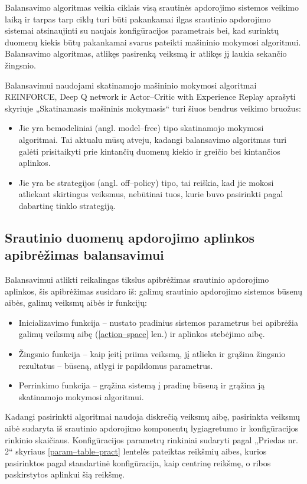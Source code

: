 \documentclass{VUMIFPSbakalaurinis}
\begin{document}
Balansavimo algoritmas veikia ciklais visą srautinės apdorojimo sistemos veikimo laiką ir tarpas tarp ciklų turi būti pakankamai ilgas srautinio apdorojimo sistemai atsinaujinti su naujais konfigūracijos parametrais bei, kad surinktų duomenų kiekis būtų pakankamai svarus pateikti mašininio mokymosi algoritmui. Balansavimo algoritmas, atlikęs pasirenką veiksmą ir atlikęs jį laukia sekančio žingsnio. 

Balansavimui naudojami skatinamojo mašininio mokymosi algoritmai REINFORCE, Deep Q network ir Actor–Critic with Experience Replay aprašyti skyriuje „Skatinamasis mašininis mokymasis“ turi šiuos bendrus veikimo bruožus:
\begin{itemize}
    \item Jie yra bemodeliniai (angl. model–free) tipo skatinamojo mokymosi algoritmai. Tai aktualu mūsų atveju, kadangi balansavimo algoritmas turi galėti prisitaikyti prie kintančių duomenų kiekio ir greičio bei kintančios aplinkos.
    \item Jie yra be strategijos (angl. off–policy) tipo, tai reiškia, kad jie mokosi atliekant skirtingus veiksmus, nebūtinai tuos, kurie buvo pasirinkti pagal dabartinę tinklo strategiją.
\end{itemize} 

\subsection{Srautinio duomenų apdorojimo aplinkos apibrėžimas balansavimui}

Balansavimui atlikti reikalingas tikslus apibrėžimas srautinio apdorojimo aplinkos, šis apibrėžimas susidaro iš: galimų srautinio apdorojimo sistemos būsenų aibės, galimų veiksmų aibės ir funkcijų:
\begin{itemize}
    \item Inicializavimo funkcija – nustato pradinius sistemos parametrus bei apibrėžia galimų veiksmų aibę (\ref{action–space} len.) ir aplinkos stebėjimo aibę.
    \item Žingsnio funkcija – kaip įeitį priima veiksmą, jį atlieka ir grąžina žingsnio rezultatus – būseną, atlygi ir papildomus parametrus.
    \item Perrinkimo funkcija – grąžina sistemą į pradinę būseną ir grąžina ją skatinamojo mokymosi algoritmui.
\end{itemize}

Kadangi pasirinkti algoritmai naudoja diskrečią veiksmų aibę, pasirinkta veiksmų aibė sudaryta iš srautinio apdorojimo komponentų lygiagretumo ir konfigūracijos rinkinio skaičiaus. Konfigūracijos parametrų rinkiniai sudaryti pagal „Priedas nr. 2“ skyriaus \ref{param–table–pract} lentelės pateiktas reikšmių aibes, kurios pasirinktos pagal standartinė konfigūracija, kaip centrinę reikšmę, o ribos paskirstytos aplinkui šią reikšmę.
\end{document}
